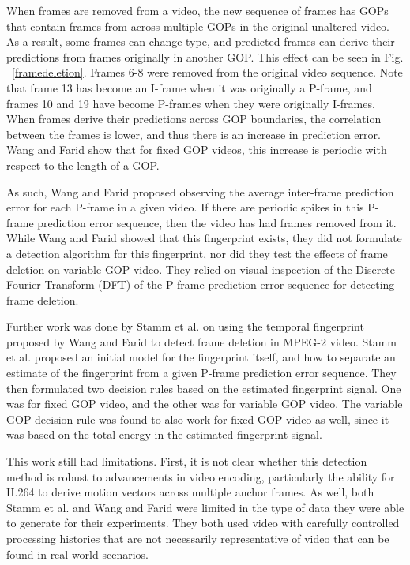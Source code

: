 When frames are removed from a video, the new sequence of frames has GOPs that contain frames from across multiple GOPs in the original unaltered video. As a result, some frames can change type, and predicted frames can derive their predictions from frames originally in another GOP. This effect can be seen in Fig. ~\ref{framedeletion}. Frames 6-8 were removed from the original video sequence. Note that frame 13 has become an I-frame when it was originally a P-frame, and frames 10 and 19 have become P-frames when they were originally I-frames. When frames derive their predictions across GOP boundaries, the correlation between the frames is lower, and thus there is an increase in prediction error. Wang and Farid show that for fixed GOP videos, this increase is periodic with respect to the length of a GOP.

As such, Wang and Farid proposed observing the average inter-frame prediction error for each P-frame in a given video. If there are periodic spikes in this P-frame prediction error sequence, then the video has had frames removed from it. While Wang and Farid showed that this fingerprint exists, they did not formulate a detection algorithm for this fingerprint, nor did they test the effects of frame deletion on variable GOP video. They relied on visual inspection of the Discrete Fourier Transform (DFT) of the P-frame prediction error sequence for detecting frame deletion.

Further work was done by Stamm et al. \cite{stamm} on using the temporal fingerprint proposed by Wang and Farid to detect frame deletion in MPEG-2 video. Stamm et al. proposed an initial model for the fingerprint itself, and how to separate an estimate of the fingerprint from a given P-frame prediction error sequence. They then formulated two decision rules based on the estimated fingerprint signal. One was for fixed GOP video, and the other was for variable GOP video. The variable GOP decision rule was found to also work for fixed GOP video as well, since it was based on the total energy in the estimated fingerprint signal.

This work still had limitations. First, it is not clear whether this detection method is robust to advancements in video encoding, particularly the ability for H.264 to derive motion vectors across multiple anchor frames. As well, both Stamm et al. and Wang and Farid were limited in the type of data they were able to generate for their experiments. They both used video with carefully controlled processing histories that are not necessarily representative of video that can be found in real world scenarios.

